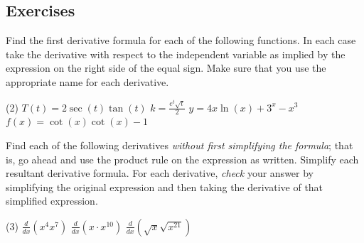 \documentclass[10pt,oneside,]{book}
\theoremstyle{plain}
\theoremstyle{definition}
\numberwithin{equation}{section}
\newcommand{\fe}[2]{#1\mathopen{}\left(#2\right)\mathclose{}}
\newcommand{\lzoo}[2]{{\frac{d}{d#1}}{\left(#2\right)}}
\begin{document}
\subsection[Exercises]{Exercises}\label{exercises-37}
Find the first derivative formula for each of the following functions.  In each case take the derivative with respect to the independent variable as implied by the expression on the right side of the equal sign.  Make sure that you use the appropriate name for each derivative.%
\par
\begin{exercisegroup}(2)
\exercise[1.]\hypertarget{exercise-371}{\null}\(\fe{T}{t}=2\fe{\sec}{t}\fe{\tan}{t}\)%
\exercise[2.]\hypertarget{exercise-372}{\null}\(k=\frac{e^t\sqrt{t}}{2}\)%
\exercise[3.]\hypertarget{exercise-373}{\null}\(y=4x\fe{\ln}{x}+3^x-x^3\)%
\exercise[4.]\hypertarget{exercise-374}{\null}\(\fe{f}{x}=\fe{\cot}{x}\fe{\cot}{x}-1\)%
\end{exercisegroup}
\par\smallskip\noindent
Find each of the following derivatives \emph{without first simplifying the formula}; that is, go ahead and use the product rule on the expression as written. Simplify each resultant derivative formula.  For each derivative, \emph{check} your answer by simplifying the original expression and then taking the derivative of that simplified expression.%
\par
\begin{exercisegroup}(3)
\exercise[5.]\hypertarget{unsimplified-product-first}{\null}\(\lzoo{x}{x^4x^7}\)%
\exercise[6.]\hypertarget{exercise-376}{\null}\(\lzoo{x}{x\cdot x^{10}}\)%
\exercise[7.]\hypertarget{unsimplified-product-last}{\null}\(\lzoo{x}{\sqrt{x}\sqrt{x^{21}}}\)%
\end{exercisegroup}
\par\smallskip\noindent
\typeout{************************************************}
\typeout{************************************************}
\end{document}
